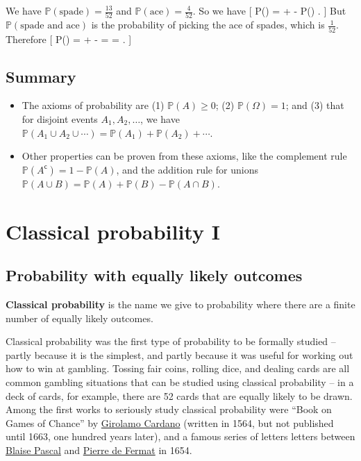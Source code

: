 \documentclass[
  letterpaper,
]{report}
\providecommand{\tightlist}{%
  \setlength{\itemsep}{0pt}\setlength{\parskip}{0pt}}\usepackage{longtable,booktabs,array}
\theoremstyle{definition}
\theoremstyle{definition}
\theoremstyle{remark}
\begin{document}
We have \(\mathbb P(\text{spade}) = \frac{13}{52}\) and
\(\mathbb P(\text{ace}) = \frac{4}{52}\). So we have {[}
\mathbb P() =  +  -
\mathbb P() . {]} But
\(\mathbb P(\text{spade and ace})\) is the probability of picking the
ace of spades, which is \(\frac{1}{52}\). Therefore {[}
\mathbb P() =  +  -
 =  =  . {]}

\hypertarget{summary-L04}{%
\section*{Summary}\label{summary-L04}}


\begin{itemize}
\tightlist
\item
  The axioms of probability are (1) \(\mathbb P(A) \geq 0\); (2)
  \(\mathbb P(\Omega) = 1\); and (3) that for disjoint events
  \(A_1, A_2, \dots\), we have
  \(\mathbb P(A_1 \cup A_2 \cup \cdots) = \mathbb P(A_1) + \mathbb P(A_2) + \cdots\).
\item
  Other properties can be proven from these axioms, like the complement
  rule \(\mathbb P(A^\mathsf{c}) = 1 - \mathbb P(A)\), and the addition
  rule for unions
  \(\mathbb P(A \cup B) = \mathbb P(A) + \mathbb P(B) - \mathbb P(A \cap B)\).
\end{itemize}

\hypertarget{L05-classical-i}{%
\chapter{Classical probability I}\label{L05-classical-i}}

\hypertarget{classical-intro}{%
\section{Probability with equally likely
outcomes}\label{classical-intro}}

\textbf{Classical probability} is the name we give to probability where
there are a finite number of equally likely outcomes.

Classical probability was the first type of probability to be formally
studied -- partly because it is the simplest, and partly because it was
useful for working out how to win at gambling. Tossing fair coins,
rolling dice, and dealing cards are all common gambling situations that
can be studied using classical probability -- in a deck of cards, for
example, there are 52 cards that are equally likely to be drawn. Among
the first works to seriously study classical probability were ``Book on
Games of Chance'' by
\href{https://mathshistory.st-andrews.ac.uk/Biographies/Cardan/}{Girolamo
Cardano} (written in 1564, but not published until 1663, one hundred
years later), and a famous series of letters letters between
\href{https://mathshistory.st-andrews.ac.uk/Biographies/Pascal/}{Blaise
Pascal} and
\href{https://mathshistory.st-andrews.ac.uk/Biographies/Fermat/}{Pierre
de Fermat} in 1654.
\end{document}
